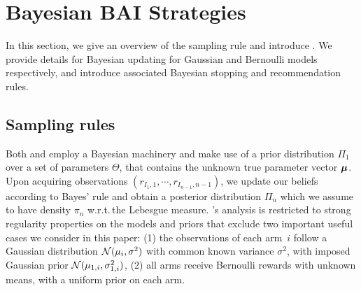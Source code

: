 \section{Bayesian BAI Strategies}\label{sec:t3c.algorithm}

In this section, we give an overview of the sampling rule \TTTS and introduce \TCC. We provide details for Bayesian updating for Gaussian and Bernoulli models respectively, and introduce associated Bayesian stopping and recommendation rules. 

\subsection{Sampling rules}

Both \TTTS and \TCC employ a Bayesian machinery and make use of a prior distribution $\Pi_1$ over a set of parameters $\Theta$, that contains the unknown true parameter vector ${\boldsymbol \mu}$. Upon acquiring observations $(r_{I_1,1},\cdots,r_{I_{n-1},n-1})$, we update our beliefs according to Bayes' rule and obtain a posterior distribution $\Pi_{n}$ which we assume to have density $\pi_n$ w.r.t.\,the Lebesgue measure. %
\citeauthor{russo2016ttts}'s analysis is restricted to strong regularity properties on the models and priors that exclude two important useful cases we consider in this paper: (1) the observations of each arm~$i$ follow a Gaussian distribution $\mathcal{N}(\mu_i,\sigma^2)$ with common known variance $\sigma^2$, with imposed Gaussian prior $\mathcal{N}(\mu_{1,i},\sigma_{1,i}^2)$, (2) all arms receive Bernoulli rewards with unknown means, with a uniform prior on each arm.

